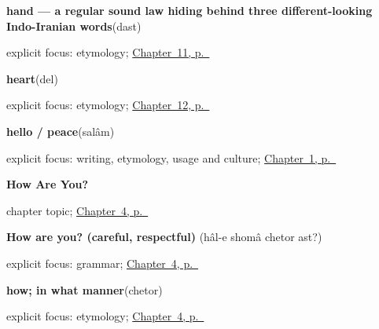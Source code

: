\noindent\begin{minipage}[t]{\linewidth}
\raggedright
\textbf{hand — a regular sound law hiding behind three different-looking Indo-Iranian words}\enspace\emph{}\enspace(dast)\par
\footnotesize explicit focus: etymology; \hyperref[ch:fa-body]{Chapter~11, p.~\pageref*{ch:fa-body}}
\end{minipage}\par\smallskip

\noindent\begin{minipage}[t]{\linewidth}
\raggedright
\textbf{heart}\enspace\emph{}\enspace(del)\par
\footnotesize explicit focus: etymology; \hyperref[ch:fa-name-heart-door-book]{Chapter~12, p.~\pageref*{ch:fa-name-heart-door-book}}
\end{minipage}\par\smallskip

\noindent\begin{minipage}[t]{\linewidth}
\raggedright
\textbf{hello / peace}\enspace\emph{}\enspace(salâm)\par
\footnotesize explicit focus: writing, etymology, usage and culture; \hyperref[ch:persian-greetings]{Chapter~1, p.~\pageref*{ch:persian-greetings}}
\end{minipage}\par\smallskip

\noindent\begin{minipage}[t]{\linewidth}
\raggedright
\textbf{How Are You?}\par
\footnotesize chapter topic; \hyperref[ch:fa-how-are-you]{Chapter~4, p.~\pageref*{ch:fa-how-are-you}}
\end{minipage}\par\smallskip

\noindent\begin{minipage}[t]{\linewidth}
\raggedright
\textbf{How are you? (careful, respectful)}\enspace\emph{   }\enspace(hâl-e shomâ chetor ast?)\par
\footnotesize explicit focus: grammar; \hyperref[ch:fa-how-are-you]{Chapter~4, p.~\pageref*{ch:fa-how-are-you}}
\end{minipage}\par\smallskip

\noindent\begin{minipage}[t]{\linewidth}
\raggedright
\textbf{how; in what manner}\enspace\emph{}\enspace(chetor)\par
\footnotesize explicit focus: etymology; \hyperref[ch:fa-how-are-you]{Chapter~4, p.~\pageref*{ch:fa-how-are-you}}
\end{minipage}\par\smallskip

